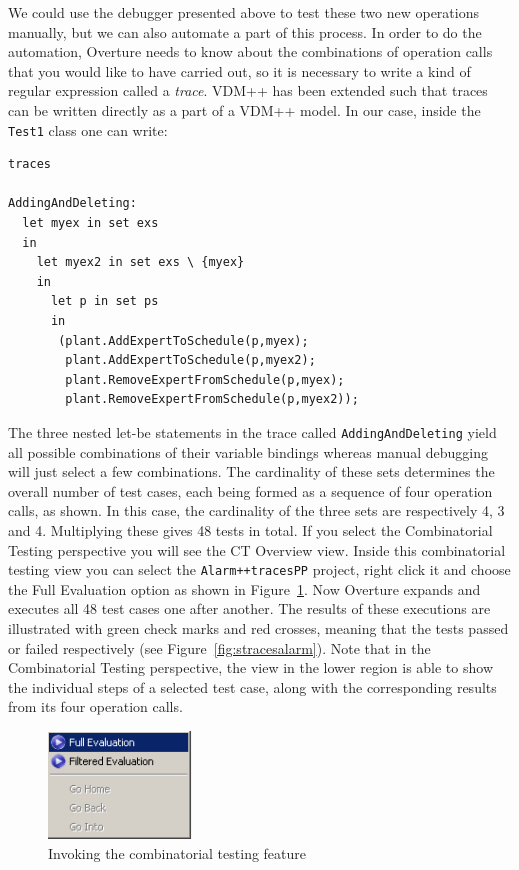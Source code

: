 We could use the debugger presented above to test these two new
operations manually, but we can also automate a part of this process.
In order to do the automation, Overture needs to know about the
combinations of operation calls that you would like to have carried
out, so it is necessary to write a kind of regular expression called a
\emph{trace}. VDM++ has been extended such that traces can be written
directly as a part of a VDM++ model. In our case, inside the \texttt{Test1}
class one can write:

\begin{lstlisting}
traces

AddingAndDeleting:
  let myex in set exs
  in
    let myex2 in set exs \ {myex}
    in
      let p in set ps
      in
       (plant.AddExpertToSchedule(p,myex);
        plant.AddExpertToSchedule(p,myex2);
        plant.RemoveExpertFromSchedule(p,myex);
        plant.RemoveExpertFromSchedule(p,myex2));
\end{lstlisting}

\noindent The three nested let-be statements in the trace
called \texttt{AddingAndDeleting} yield all possible combinations of
their variable bindings whereas manual debugging will just select a
few combinations.  The cardinality of these sets determines the
overall number of test cases, each being formed as a sequence of four
operation calls, as shown. In this case, the cardinality of the three
sets are respectively 4, 3 and 4. Multiplying these gives 48 tests in total. If you
select the Combinatorial Testing perspective you will see the
\textsf{CT Overview} view.
Inside this combinatorial testing view you can
select the \texttt{Alarm++tracesPP} project, right click it and
choose the \textsf{Full
  Evaluation} option as shown in Figure~\ref{fig:CToptions}.
Now Overture expands and executes all 48 test cases one after
another. The results of these executions are illustrated with green
check marks and red crosses, meaning that the tests passed or failed
respectively (see Figure~\ref{fig:stracesalarm}). Note that in the
Combinatorial Testing perspective, the view in the lower region is
able to show the individual steps of a selected test case, along with
the corresponding results from its four operation calls.

\begin{figure}[htbp]
\begin{center}
\includegraphics[width=1.5in]{figures/CToptions}
\caption{Invoking the combinatorial testing feature\label{fig:CToptions}}
\end{center}
\end{figure}

